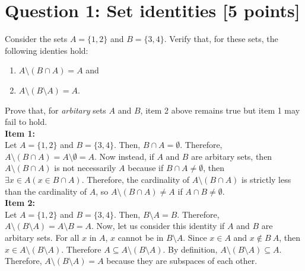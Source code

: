 \documentclass{report}
\theoremstyle{mytheoremstyle}
\theoremstyle{mytheoremstyle}
\theoremstyle{myproblemstyle}
\begin{document}
\section*{\Large{Question 1: Set identities [5 points]}}
Consider the sets $A = \{1, 2\}$ and $B = \{3, 4\}$. Verify that, for these sets, the following identies hold: 
\begin{enumerate}
    \item $A \setminus (B \cap A) = A$ and 
    \item $A \setminus (B \setminus A) = A$.
\end{enumerate} 
Prove that, for \textit{arbitary} sets $A$ and $B$, item 2 above remains true but item 1 may fail to hold.
\\[\baselineskip]
\textbf{Item 1:}\\
Let $A = \{1, 2\}$ and $B = \{3, 4\}$. Then, $B \cap A = \emptyset$. Therefore, $A \setminus (B \cap A) = A \setminus \emptyset = A$. Now instead, if $A$ and $B$ are arbitary sets, then $A \setminus (B \cap A)$ is not necessarily $A$ because if $B \cap A \neq \emptyset$, then $\exists x \in A ( x \in B \cap A )$. Therefore, the cardinality of $A \setminus (B \cap A)$ is strictly less than the cardinality of $A$, so $A \setminus (B \cap A) \neq A$ if $A \cap B \neq \emptyset$.
\\[\baselineskip]
\textbf{Item 2:}\\
Let $A = \{1, 2\}$ and $B = \{3, 4\}$. Then, $B \setminus A = B$. Therefore, $A \setminus (B \setminus A) = A \setminus B = A$. Now, let us consider this identity if $A$ and $B$ are arbitary sets. For all $x$ in $A$, $x$ cannot be in $B \setminus A$. Since $x\in A$ and $x \notin B \ A$, then $x \in A \setminus (B \setminus A)$. Therefore $A \subseteq A \setminus (B \setminus A)$. By definition, $A \setminus (B \setminus A) \subseteq A$. Therefore, $A \setminus (B \setminus A) = A$ because they are subspaces of each other. 
\newpage
\end{document}
